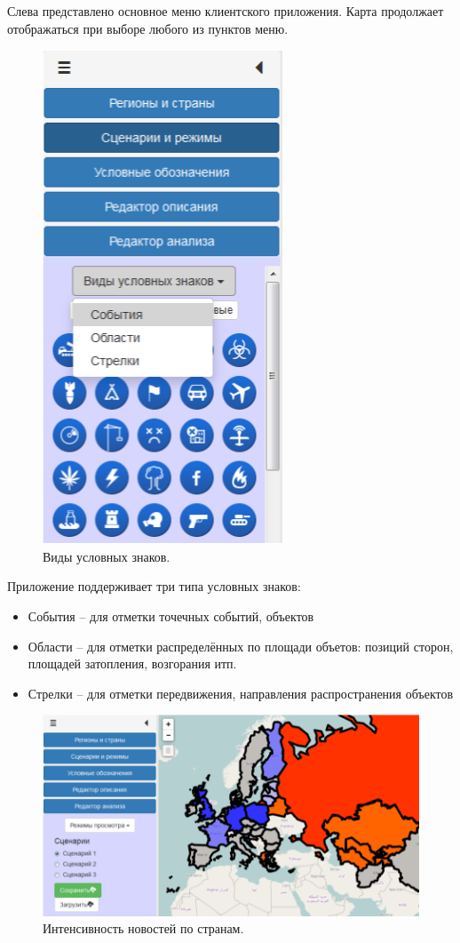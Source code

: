 Слева представлено основное меню клиентского приложения. Карта продолжает отображаться при выборе любого из пунктов меню.

\clearpage
\begin{figure}[!h]
\centering
\includegraphics{technology/gui/2}
\caption{Виды условных знаков.}
\label{figure:gui2}
\end{figure}

Приложение поддерживает три типа условных знаков:

\begin{itemize}
\item События -- для отметки точечных событий, объектов
\item Области -- для отметки распределённых по площади объетов: позиций сторон, площадей затопления, возгорания итп.
\item Стрелки -- для отметки передвижения, направления распространения объектов 
\end{itemize}

\clearpage
\begin{figure}[!h]
\centering
\includegraphics[width=\textwidth]{technology/gui/3}
\caption{Интенсивность новостей по странам.}
\label{figure:gui3}
\end{figure}

